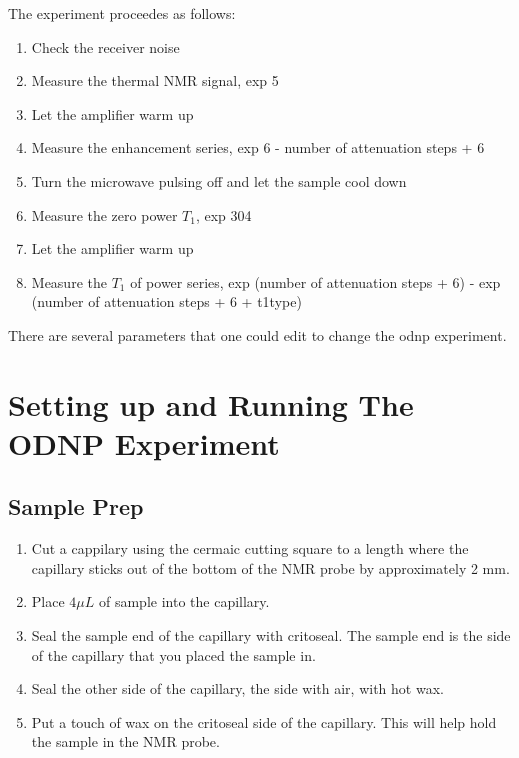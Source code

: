 \documentclass{article}
\begin{document}
The experiment proceedes as follows:
\begin{enumerate}
	\item{Check the receiver noise}
	\item{Measure the thermal NMR signal, exp 5}
	\item{Let the amplifier warm up}
	\item{Measure the enhancement series, exp 6 - number of attenuation steps + 6}
	\item{Turn the microwave pulsing off and let the sample cool down}
	\item{Measure the zero power $T_1$, exp 304}
	\item{Let the amplifier warm up}
	\item{Measure the $T_1$ of power series, exp (number of attenuation steps + 6) - exp (number of attenuation steps + 6 + t1type)}
\end{enumerate}

There are several parameters that one could edit to change the odnp experiment.



\section{Setting up and Running The ODNP Experiment}
\label{sec:runningODNP}

\subsection{Sample Prep}
\begin{enumerate}
    \item Cut a cappilary using the cermaic cutting square to a length where the capillary sticks out of the bottom of the NMR probe by approximately 2 mm.
    \item Place $4 \mu L$ of sample into the capillary.
    \item Seal the sample end of the capillary with critoseal. The sample end is the side of the capillary that you placed the sample in.
    \item Seal the other side of the capillary, the side with air, with hot wax.
    \item Put a touch of wax on the critoseal side of the capillary. This will help hold the sample in the NMR probe.
\end{enumerate}
\end{document}
